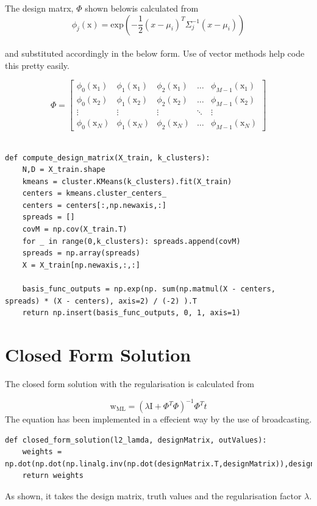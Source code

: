 \documentclass[a4paper,11pt]{article}
\begin{document}
The design matrx, $\Phi$ shown belowis calculated from 
\[
\phi_{j}(\mathrm{x}) = \mathrm{exp}  \left(- \frac{1}{2}\left(x-\mu_i\right)^T\Sigma_{j}^{-1}\left(x-\mu_i\right)  \right)
\]\\
and substituted accordingly in the below form. Use of vector methods help code this pretty easily.

\[\Phi = 
\begin{bmatrix}
	\phi_{0}(\mathrm{x}_1) & 	\phi_{1}(\mathrm{x}_1) & 	\phi_{2}(\mathrm{x}_1) & \dots  & 	\phi_{M-1}(\mathrm{x}_1)\\
		\phi_{0}(\mathrm{x}_2) & 	\phi_{1}(\mathrm{x}_2) & 	\phi_{2}(\mathrm{x}_2) & \dots  & 	\phi_{M-1}(\mathrm{x}_2) \\
	\vdots & \vdots & \vdots & \ddots & \vdots \\
		\phi_{0}(\mathrm{x}_N) & 	\phi_{1}(\mathrm{x}_N) & 	\phi_{2}(\mathrm{x}_N) & \dots  & 	\phi_{M-1}(\mathrm{x}_N)
\end{bmatrix}\]
\\

\begin{lstlisting}[label={list:second}]
def compute_design_matrix(X_train, k_clusters):
	N,D = X_train.shape
	kmeans = cluster.KMeans(k_clusters).fit(X_train)
	centers = kmeans.cluster_centers_
	centers = centers[:,np.newaxis,:]
	spreads = []
	covM = np.cov(X_train.T)
	for _ in range(0,k_clusters): spreads.append(covM)
	spreads = np.array(spreads)
	X = X_train[np.newaxis,:,:]

	basis_func_outputs = np.exp(np. sum(np.matmul(X - centers, spreads) * (X - centers), axis=2) / (-2) ).T
	return np.insert(basis_func_outputs, 0, 1, axis=1)
\end{lstlisting}

\section*{Closed Form Solution}

The closed form solution with the regularisation is calculated from 

\[ \mathrm{w_{ML}} = \left( \lambda\mathrm{I} + \Phi^T\Phi \right)^{-1}\Phi^Tt \]
The equation has been implemented in a effecient way by the use of broadcasting.

\begin{lstlisting}[label={list:third}]
def closed_form_solution(l2_lamda, designMatrix, outValues):
	weights = np.dot(np.dot(np.linalg.inv(np.dot(designMatrix.T,designMatrix)),designMatrix.T),outValues)
	return weights
\end{lstlisting}
As shown, it takes the design matrix, truth values and the regularisation factor $\lambda$.
\end{document}
